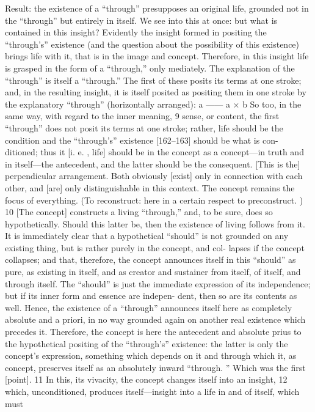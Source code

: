 Result: the existence of a “through” presupposes an original life,
grounded not in the “through” but entirely in itself.
We see into this at once:
but what is contained in this insight?
Evidently the insight formed in positing
the “through’s” existence
(and the question about the possibility of this existence)
brings life with it,
that is in the image and concept.
Therefore, in this insight life is grasped
in the form of a “through,” only mediately.
The explanation of the “through” is itself a “through.”
The first of these posits its terms at one stroke;
and, in the resulting insight,
it is itself posited as positing them in one stroke
by the explanatory “through” (horizontally arranged):
a
——
a × b
So too, in the same way, with regard to the inner meaning, 9 sense, or content,
the first “through” does not posit its terms at one stroke; rather, life should be
the condition and the “through’s” existence [162–163] should be what is con-
ditioned; thus it [i.
e.
, life] should be in the concept as a concept—in truth and
in itself—the antecedent, and the latter should be the consequent.
 [This is
the] perpendicular arrangement.
 Both obviously [exist] only in connection with
each other, and [are] only distinguishable in this context.
The concept remains the focus of everything.
 (To reconstruct: here in a
certain respect to preconstruct.
) 10 [The concept] constructs a living “through,”
and, to be sure, does so hypothetically.
 Should this latter be, then the existence
of living follows from it.
 It is immediately clear that a hypothetical “should” is
not grounded on any existing thing, but is rather purely in the concept, and col-
lapses if the concept collapses; and that, therefore, the concept announces
itself in this “should” as pure, as existing in itself, and as creator and sustainer
from itself, of itself, and through itself.
 The “should” is just the immediate
expression of its independence; but if its inner form and essence are indepen-
dent, then so are its contents as well.
 Hence, the existence of a “through”
announces itself here as completely absolute and a priori, in no way grounded
again on another real existence which precedes it.
 Therefore, the concept is
here the antecedent and absolute prius to the hypothetical positing of the
“through’s” existence: the latter is only the concept’s expression, something
which depends on it and through which it, as concept, preserves itself as an
absolutely inward “through.
” Which was the first [point].
 11
In this, its vivacity, the concept changes itself into an insight, 12 which,
unconditioned, produces itself—insight into a life in and of itself, which must
